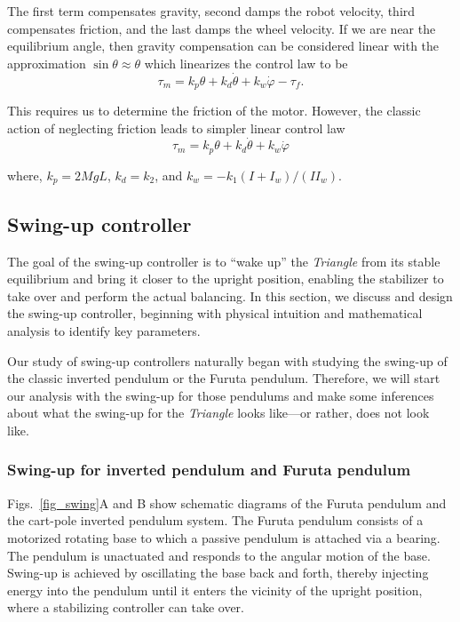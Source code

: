 \documentclass{article}
\begin{document}
The first term compensates gravity, second damps the robot velocity, third compensates friction, and the last damps the wheel velocity. If we are near the equilibrium angle, then gravity compensation can be considered linear with the approximation $\sin\theta\approx\theta$ which linearizes the control law to be
\begin{equation}
  \tau_m=k_{p}\theta+k_d\dot{\theta}+k_{w}\dot{\varphi}-\tau_{f}.
\end{equation}

This requires us to determine the friction of the motor. However, the classic action of neglecting friction leads to simpler linear control law
\begin{equation}
  \tau_m=k_{p}\theta+k_d\dot{\theta}+k_{w}\dot{\varphi}
\end{equation}

where, $k_{p}=2MgL$, $k_{d}=k_{2}$, and $k_{w}=-k_{1}(I+I_w)/(II_{w})$.

\subsection{Swing-up controller}

The goal of the swing-up controller is to “wake up” the \textit{Triangle} from its stable equilibrium and bring it closer to the upright position, enabling the stabilizer to take over and perform the actual balancing. In this section, we discuss and design the swing-up controller, beginning with physical intuition and mathematical analysis to identify key parameters.

Our study of swing-up controllers naturally began with studying the swing-up of the classic inverted pendulum or the Furuta pendulum. Therefore, we will start our analysis with the swing-up for those pendulums and make some inferences about what the swing-up for the \textit{Triangle} looks like—or rather, does not look like.

\subsubsection*{Swing-up for inverted pendulum and Furuta pendulum}

Figs.~\ref{fig_swing}A and B show schematic diagrams of the Furuta pendulum and the cart-pole inverted pendulum system. The Furuta pendulum consists of a motorized rotating base to which a passive pendulum is attached via a bearing. The pendulum is unactuated and responds to the angular motion of the base. Swing-up is achieved by oscillating the base back and forth, thereby injecting energy into the pendulum until it enters the vicinity of the upright position, where a stabilizing controller can take over.
\end{document}
